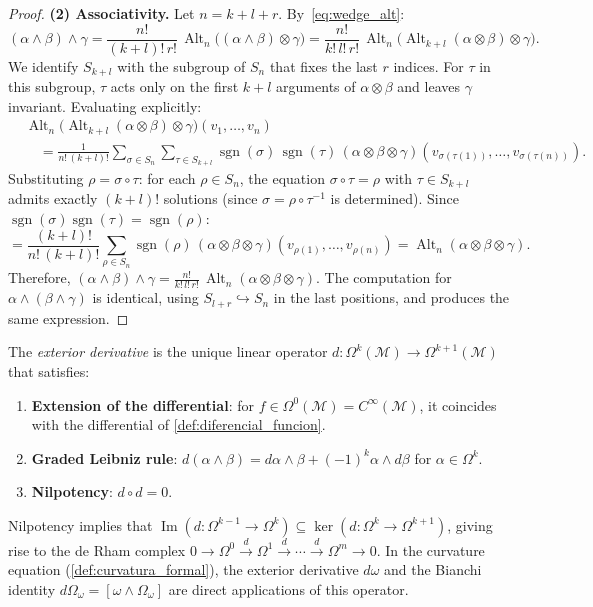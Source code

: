 \begin{proof}
\textbf{(2) Associativity.} Let $n = k+l+r$. By~\eqref{eq:wedge_alt}:
\[
(\alpha \wedge \beta) \wedge \gamma = \frac{n!}{(k{+}l)!\,r!}\,\operatorname{Alt}_n\!\big((\alpha \wedge \beta) \otimes \gamma\big) = \frac{n!}{k!\,l!\,r!}\,\operatorname{Alt}_n\!\big(\operatorname{Alt}_{k+l}(\alpha \otimes \beta) \otimes \gamma\big).
\]
We identify $S_{k+l}$ with the subgroup of $S_n$ that fixes the last $r$ indices. For $\tau$ in this subgroup, $\tau$ acts only on the first $k+l$ arguments of $\alpha \otimes \beta$ and leaves $\gamma$ invariant. Evaluating explicitly:
\begin{align*}
&\operatorname{Alt}_n\!\big(\operatorname{Alt}_{k+l}(\alpha \otimes \beta) \otimes \gamma\big)(v_1, \ldots, v_n) \\
  &\quad= \frac{1}{n!\,(k{+}l)!}\sum_{\sigma \in S_n}\sum_{\tau \in S_{k+l}}\operatorname{sgn}(\sigma)\,\operatorname{sgn}(\tau)\,(\alpha \otimes \beta \otimes \gamma)(v_{\sigma(\tau(1))}, \ldots, v_{\sigma(\tau(n))}).
\end{align*}
Substituting $\rho = \sigma \circ \tau$: for each $\rho \in S_n$, the equation $\sigma \circ \tau = \rho$ with $\tau \in S_{k+l}$ admits exactly $(k{+}l)!$ solutions (since $\sigma = \rho \circ \tau^{-1}$ is determined). Since $\operatorname{sgn}(\sigma)\operatorname{sgn}(\tau) = \operatorname{sgn}(\rho)$:
\[
= \frac{(k{+}l)!}{n!\,(k{+}l)!}\sum_{\rho \in S_n}\operatorname{sgn}(\rho)\,(\alpha \otimes \beta \otimes \gamma)(v_{\rho(1)}, \ldots, v_{\rho(n)}) = \operatorname{Alt}_n(\alpha \otimes \beta \otimes \gamma).
\]
Therefore, $(\alpha \wedge \beta) \wedge \gamma = \frac{n!}{k!\,l!\,r!}\,\operatorname{Alt}_n(\alpha \otimes \beta \otimes \gamma)$. The computation for $\alpha \wedge (\beta \wedge \gamma)$ is identical, using $S_{l+r} \hookrightarrow S_n$ in the last positions, and produces the same expression.
\end{proof}

\begin{definition}\label{def:derivada_exterior}
The \textit{exterior derivative} is the unique linear operator $d: \Omega^k(\mathcal{M}) \to \Omega^{k+1}(\mathcal{M})$ that satisfies:
\begin{enumerate}
    \item \textbf{Extension of the differential}: for $f \in \Omega^0(\mathcal{M}) = C^\infty(\mathcal{M})$, it coincides with the differential of \autoref{def:diferencial_funcion}.
    \item \textbf{Graded Leibniz rule}: $d(\alpha \wedge \beta) = d\alpha \wedge \beta + (-1)^k \alpha \wedge d\beta$ for $\alpha \in \Omega^k$.
    \item \textbf{Nilpotency}: $d \circ d = 0$.
\end{enumerate}
Nilpotency implies that $\operatorname{Im}(d: \Omega^{k-1} \to \Omega^k) \subseteq \ker(d: \Omega^k \to \Omega^{k+1})$, giving rise to the de Rham complex $0 \to \Omega^0 \xrightarrow{d} \Omega^1 \xrightarrow{d} \cdots \xrightarrow{d} \Omega^m \to 0$. In the curvature equation (\autoref{def:curvatura_formal}), the exterior derivative $d\omega$ and the Bianchi identity $d\Omega_\omega = [\omega \wedge \Omega_\omega]$ are direct applications of this operator.
\end{definition}

